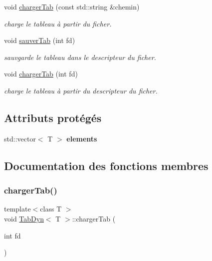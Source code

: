 \begin{DoxyCompactItemize}
void \mbox{\hyperlink{class_tab_dyn_a0691ddc682fa501ce7dbd0a7d1f9e261}{charger\+Tab}} (const std\+::string \&chemin)
\begin{DoxyCompactList}\small\item\em charge le tableau à partir du ficher. \end{DoxyCompactList}\item 
void \mbox{\hyperlink{class_tab_dyn_acfc88ef40cb66400e9dd2ff120b5273a}{sauver\+Tab}} (int fd)
\begin{DoxyCompactList}\small\item\em sauvgarde le tableau dans le descripteur du ficher. \end{DoxyCompactList}\item 
void \mbox{\hyperlink{class_tab_dyn_acd5db90f6eb28d32314e91586d43b1a3}{charger\+Tab}} (int fd)
\begin{DoxyCompactList}\small\item\em charge le tableau à partir du descripteur du ficher. \end{DoxyCompactList}\end{DoxyCompactItemize}
\subsection*{Attributs protégés}
\begin{DoxyCompactItemize}
\item 
\mbox{\label{class_tab_dyn_a5cc36063858ffd2fabb9b87aa04ae10b}} 
std\+::vector$<$ T $>$ {\bfseries elements}
\end{DoxyCompactItemize}


\subsection{Documentation des fonctions membres}
\mbox{\label{class_tab_dyn_acd5db90f6eb28d32314e91586d43b1a3}} 
\subsubsection{\texorpdfstring{charger\+Tab()}{chargerTab()}}
{\footnotesize\ttfamily template$<$class T $>$ \\
void \mbox{\hyperlink{class_tab_dyn}{Tab\+Dyn}}$<$ T $>$\+::charger\+Tab (\begin{DoxyParamCaption}\item[{int}]{fd }\end{DoxyParamCaption})}



